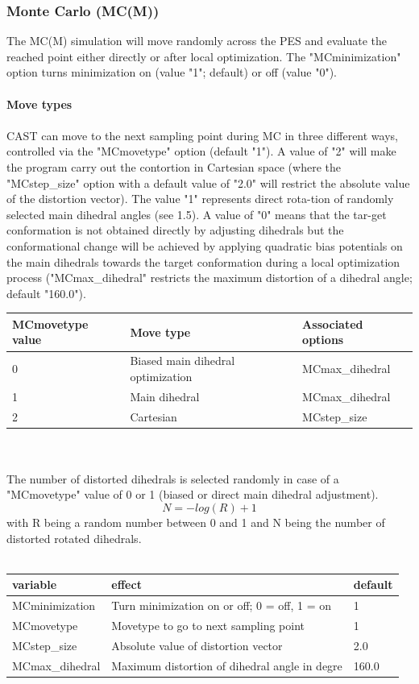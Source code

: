 \documentclass[10pt,a4paper]{article} %
\begin{document}
{	\subsubsection{Monte Carlo (MC(M))}
	The MC(M) simulation will move randomly across the PES and evaluate the reached point either directly or after local optimization. The "MCminimization" option turns minimization on (value "1"; default) or off (value "0"). \\~\\
	\textbf{Move types}\\~\\
	CAST can move to the next sampling point during MC in three different ways, controlled via the "MCmovetype" option (default "1"). A value of "2" will make the program carry out the contortion in Cartesian space (where the "MCstep_size" option with a default value of "2.0" will restrict the absolute value of the distortion vector). The value "1" represents direct rota-tion of randomly selected main dihedral angles (see 1.5). A value of "0" means that the tar-get conformation is not obtained directly by adjusting dihedrals but the conformational change will be achieved by applying quadratic bias potentials on the main dihedrals towards the target conformation during a local optimization process ("MCmax_dihedral" restricts the maximum distortion of a dihedral angle; default "160.0"). \\

	\begin{tabularx}{\textwidth}{l|X|X}
		MCmovetype value & Move type & Associated options \\
		\hline
		0 & Biased main dihedral optimization & MCmax_dihedral \\
		1 & Main dihedral & MCmax_dihedral \\
		2 & Cartesian & MCstep_size \\
	\end{tabularx}
	\\~\\
	The number of distorted dihedrals is selected randomly in case of a "MCmovetype" value of 0 or 1 (biased or direct main dihedral adjustment).
	\begin{equation}
	N = - log (R) + 1
	\end{equation}
	with R being a random number between 0 and 1 and N being the number of distorted rotated dihedrals.\\~\\
	\begin{tabularx}{\textwidth}{l|X|X}
		variable & effect & default \\
		\hline
		MCminimization & Turn minimization on or off; 0 = off, 1 = on & 1 \\
		MCmovetype & Movetype to go to next sampling point & 1 \\
		MCstep_size & Absolute value of distortion vector & 2.0 \\
		MCmax_dihedral & Maximum distortion of dihedral angle in degre & 160.0 \\
	\end{tabularx}
	\\~\\

}
\end{document}
